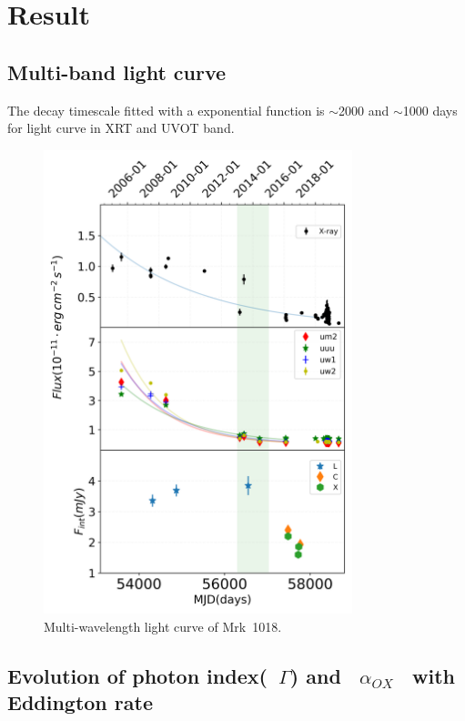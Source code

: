 \documentclass{aastex63}
\begin{document}
\section{Result}
\label{sec:result}

\subsection{Multi-band light curve}
The decay timescale fitted with a exponential function is $\sim$2000 and $\sim$1000 days for light curve in XRT and UVOT band. 

\begin{figure}
\centering
	\includegraphics[width=0.8\textwidth]{./pic/subplots-xrt_uvot-radio-second.png}
    \caption{Multi-wavelength light curve of Mrk~1018.}
    \label{fig:multi-lc-secondaxis}
\end{figure}


\subsection{Evolution of photon index(~\texorpdfstring{$\Gamma$}.) and ~\texorpdfstring{$\alpha_{OX}$}.~ with Eddington rate \label{subsec:g-f}}
\end{document}
